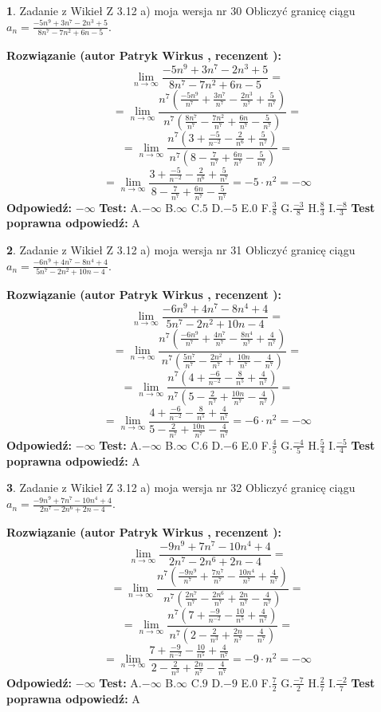 \documentclass[12pt, a4paper]{article}
\theoremstyle{definition} %
\newtheorem{zad}{}
\newcommand{\zadStart}[1]{\begin{zad}#1\newline}
\newcommand{\zadStop}{\end{zad}}
\newcommand{\rozwStart}[2]{\noindent \textbf{Rozwiązanie (autor #1 , recenzent #2): }\newline}
\newcommand{\rozwStop}{\newline}
\newcommand{\odpStart}{\noindent \textbf{Odpowiedź:}\newline}
\newcommand{\odpStop}{\newline}
\newcommand{\testStart}{\noindent \textbf{Test:}\newline}
\newcommand{\testStop}{\newline}
\newcommand{\kluczStart}{\noindent \textbf{Test poprawna odpowiedź:}\newline}
\newcommand{\kluczStop}{\newline}
\begin{document}
\zadStart{Zadanie z Wikieł Z 3.12 a) moja wersja nr 30}
Obliczyć granicę ciągu $a_{n}=\frac{-5n^{9}+3n^{7}-2n^{3}+5}{8n^{7}-7n^{2}+6n-5}$.
\zadStop
\rozwStart{Patryk Wirkus}{}
$$\lim\limits_{n\to\infty}\frac{-5n^{9}+3n^{7}-2n^{3}+5}{8n^{7}-7n^{2}+6n-5}=$$
$$=\lim\limits_{n\to\infty}\frac{n^{7}\left(\frac{-5n^{9}}{n^{7}}+\frac{3n^{7}}{n^{7}}-\frac{2n^{3}}{n^{7}}+\frac{5}{n^{7}}\right)}{n^{7}\left(\frac{8n^{7}}{n^{7}}-\frac{7n^{2}}{n^{7}}+\frac{6n}{n^{7}}-\frac{5}{n^{7}}\right)}=$$
$$=\lim\limits_{n\to\infty}\frac{n^{7}\left(3+\frac{-5}{n^{-2}}-\frac{2}{n^{6}}+\frac{5}{n^{7}}\right)}
{n^{7}\left(8-\frac{7}{n^{7}}+\frac{6n}{n^{7}}-\frac{5}{n^{7}}\right)}=$$
$$=\lim\limits_{n\to\infty}\frac{3+\frac{-5}{n^{-2}}-\frac{2}{n^{6}}+\frac{5}{n^{7}}}{8-\frac{7}{n^{7}}+\frac{6n}{n^{7}}-\frac{5}{n^{7}}}=-5\cdot n^{2} = -\infty$$
\rozwStop
\odpStart
$-\infty$
\odpStop
\testStart
A.$-\infty$
B.$\infty$
C.$5$
D.$-5$
E.$0$
F.$\frac{3}{8}$
G.$\frac{-3}{8}$
H.$\frac{8}{3}$
I.$\frac{-8}{3}$
\testStop
\kluczStart
A
\kluczStop



\zadStart{Zadanie z Wikieł Z 3.12 a) moja wersja nr 31}
Obliczyć granicę ciągu $a_{n}=\frac{-6n^{9}+4n^{7}-8n^{4}+4}{5n^{7}-2n^{2}+10n-4}$.
\zadStop
\rozwStart{Patryk Wirkus}{}
$$\lim\limits_{n\to\infty}\frac{-6n^{9}+4n^{7}-8n^{4}+4}{5n^{7}-2n^{2}+10n-4}=$$
$$=\lim\limits_{n\to\infty}\frac{n^{7}\left(\frac{-6n^{9}}{n^{7}}+\frac{4n^{7}}{n^{7}}-\frac{8n^{4}}{n^{7}}+\frac{4}{n^{7}}\right)}{n^{7}\left(\frac{5n^{7}}{n^{7}}-\frac{2n^{2}}{n^{7}}+\frac{10n}{n^{7}}-\frac{4}{n^{7}}\right)}=$$
$$=\lim\limits_{n\to\infty}\frac{n^{7}\left(4+\frac{-6}{n^{-2}}-\frac{8}{n^{5}}+\frac{4}{n^{7}}\right)}
{n^{7}\left(5-\frac{2}{n^{7}}+\frac{10n}{n^{7}}-\frac{4}{n^{7}}\right)}=$$
$$=\lim\limits_{n\to\infty}\frac{4+\frac{-6}{n^{-2}}-\frac{8}{n^{5}}+\frac{4}{n^{7}}}{5-\frac{2}{n^{7}}+\frac{10n}{n^{7}}-\frac{4}{n^{7}}}=-6\cdot n^{2} = -\infty$$
\rozwStop
\odpStart
$-\infty$
\odpStop
\testStart
A.$-\infty$
B.$\infty$
C.$6$
D.$-6$
E.$0$
F.$\frac{4}{5}$
G.$\frac{-4}{5}$
H.$\frac{5}{4}$
I.$\frac{-5}{4}$
\testStop
\kluczStart
A
\kluczStop



\zadStart{Zadanie z Wikieł Z 3.12 a) moja wersja nr 32}
Obliczyć granicę ciągu $a_{n}=\frac{-9n^{9}+7n^{7}-10n^{4}+4}{2n^{7}-2n^{6}+2n-4}$.
\zadStop
\rozwStart{Patryk Wirkus}{}
$$\lim\limits_{n\to\infty}\frac{-9n^{9}+7n^{7}-10n^{4}+4}{2n^{7}-2n^{6}+2n-4}=$$
$$=\lim\limits_{n\to\infty}\frac{n^{7}\left(\frac{-9n^{9}}{n^{7}}+\frac{7n^{7}}{n^{7}}-\frac{10n^{4}}{n^{7}}+\frac{4}{n^{7}}\right)}{n^{7}\left(\frac{2n^{7}}{n^{7}}-\frac{2n^{6}}{n^{7}}+\frac{2n}{n^{7}}-\frac{4}{n^{7}}\right)}=$$
$$=\lim\limits_{n\to\infty}\frac{n^{7}\left(7+\frac{-9}{n^{-2}}-\frac{10}{n^{5}}+\frac{4}{n^{7}}\right)}
{n^{7}\left(2-\frac{2}{n^{3}}+\frac{2n}{n^{7}}-\frac{4}{n^{7}}\right)}=$$
$$=\lim\limits_{n\to\infty}\frac{7+\frac{-9}{n^{-2}}-\frac{10}{n^{5}}+\frac{4}{n^{7}}}{2-\frac{2}{n^{3}}+\frac{2n}{n^{7}}-\frac{4}{n^{7}}}=-9\cdot n^{2} = -\infty$$
\rozwStop
\odpStart
$-\infty$
\odpStop
\testStart
A.$-\infty$
B.$\infty$
C.$9$
D.$-9$
E.$0$
F.$\frac{7}{2}$
G.$\frac{-7}{2}$
H.$\frac{2}{7}$
I.$\frac{-2}{7}$
\testStop
\kluczStart
A
\kluczStop
\end{document}
